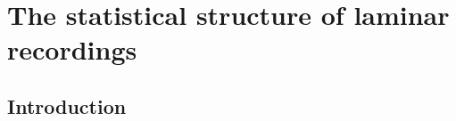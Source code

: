 \chapter{The statistical structure of laminar recordings}
\label{chap:sparse}

\section{Introduction}






